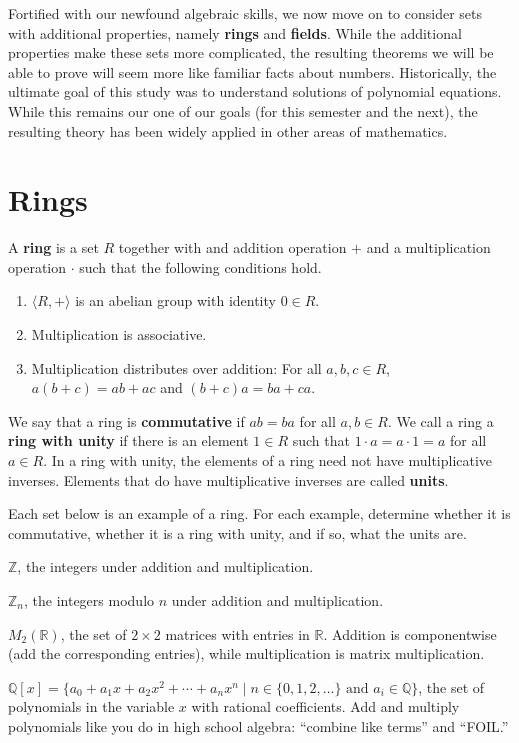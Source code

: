 Fortified with our newfound algebraic skills, we now move on to consider sets with additional properties, namely \textbf{rings} and \textbf{fields}. While the additional properties make these sets more complicated, the resulting theorems we will be able to prove will seem more like familiar facts about numbers. Historically, the ultimate goal of this study was to understand solutions of polynomial equations. While this remains our one of our goals (for this semester and the next), the resulting theory has been widely applied in other areas of mathematics.

\section{Rings}

\begin{definition}
A \textbf{ring} is a set \(R\) together with and addition operation \(+\) and a multiplication operation \(\cdot\) such that the following conditions hold.
\begin{enumerate}
  \item \(\langle  R, + \rangle \) is an abelian group with identity \(0 \in R\).
  \item Multiplication is associative.
  \item Multiplication distributes over addition: For all \(a,b,c\in R\), \(a(b+c)=ab+ac\) and \((b+c)a=ba+ca\).
\end{enumerate}
\end{definition}

We say that a ring is \textbf{commutative} if \(ab = ba\) for all \(a,b\in R\).
We call a ring a \textbf{ring with unity} if there is an element \(1\in R\) such that \(1\cdot a = a\cdot 1=a\) for all \(a\in R\).
In a ring with unity, the elements of a ring need not have multiplicative inverses. Elements that do have multiplicative inverses are called \textbf{units}.

\begin{problem}
Each set below is an example of a ring. For each example, determine whether it is commutative, whether it is a ring with unity, and if so, what the units are.
\begin{problemparts}
  \item \(\mathbb{Z}\), the integers under addition and multiplication.
  \item \(\mathbb{Z}_n\), the integers modulo \(n\) under addition and multiplication.
  \item \(M_2(\mathbb{R})\), the set of \(2\times 2\) matrices with entries in \(\mathbb{R}\). Addition is componentwise (add the corresponding entries), while multiplication is matrix multiplication.
  \item \(\mathbb{Q}[x]=\{a_0+a_1x+a_2x^2+\cdots+a_nx^n \mid n\in \{0,1,2,\ldots\}\mbox{ and } a_i\in \mathbb{Q}\}\), the set of polynomials in the variable \(x\) with rational coefficients. Add and multiply polynomials like you do in high school algebra: ``combine like terms'' and ``FOIL.''
\end{problemparts}
\end{problem}

